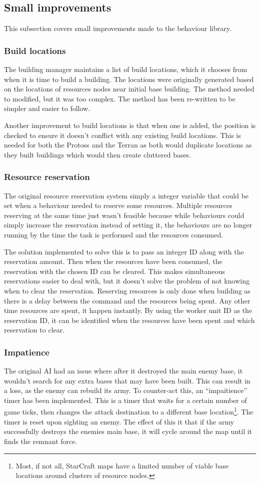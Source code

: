 \documentclass[11pt,openright,a4paper]{report}
\begin{document}
\subsection{Small improvements}
This subsection covers small improvements made to the behaviour library.
\subsubsection{Build locations}
The building manager maintains a list of build locations, which it chooses from when it is time to build a building. The locations were originally generated based on the locations of resources nodes near initial base building. The method needed to modified, but it was too complex. The method has been re-written to be simpler and easier to follow.

Another improvement to build locations is that when one is added, the position is checked to ensure it doesn't conflict with any existing build locations. This is needed for both the Protoss and the Terran as both would duplicate locations as they built buildings which would then create cluttered bases.
\subsubsection{Resource reservation}
The original resource reservation system simply a integer variable that could be set when a behaviour needed to reserve some resources. Multiple resources reserving at the same time just wasn't feasible because while behaviours could simply increase the reservation instead of setting it, the behaviours are no longer running by the time the task is performed and the resources consumed.

The solution implemented to solve this is to pass an integer ID along with the reservation amount. Then when the resources have been consumed, the reservation with the chosen ID can be cleared. This makes simultaneous reservations easier to deal with, but it doesn't solve the problem of not knowing when to clear the reservation. Reserving resources is only done when building as there is a delay between the command and the resources being spent. Any other time resources are spent, it happen instantly. By using the worker unit ID as the reservation ID, it can be identified when the resources have been spent and which reservation to clear.
\subsubsection{Impatience}
The original AI had an issue where after it destroyed the main enemy base, it wouldn't search for any extra bases that may have been built. This can result in a loss, as the enemy can rebuild its army. To counter-act this, an ``impaitience'' timer has been implemented. This is a timer that waits for a certain number of game ticks, then changes the attack destination to a different base location\footnote{Most, if not all, StarCraft maps have a limited number of viable base locations around clusters of resource nodes.}. The timer is reset upon sighting an enemy. The effect of this it that if the army successfully destroys the enemies main base, it will cycle around the map until it finds the remnant force.
\end{document}
